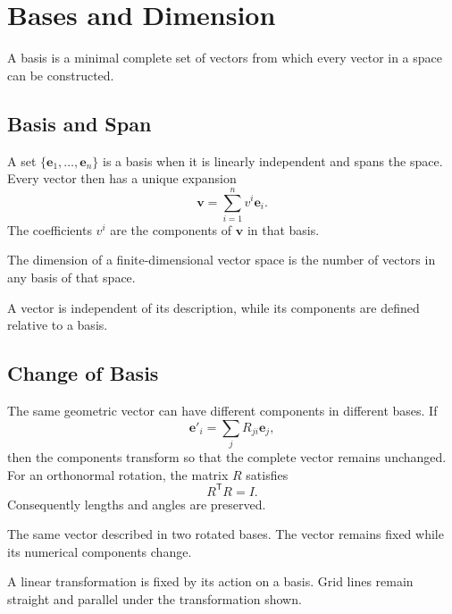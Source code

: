 \section{Bases and Dimension}
\label{sec:bases-dimension}

A basis is a minimal complete set of vectors from which every vector in a space can be constructed.

\subsection{Basis and Span}

A set $\{\mathbf e_1,\ldots,\mathbf e_n\}$ is a basis when it is linearly independent and spans the space. Every vector then has a unique expansion
\[
\mathbf v=\sum_{i=1}^{n}v^i\mathbf e_i.
\]
The coefficients $v^i$ are the components of $\mathbf v$ in that basis.

\begin{definition}
The dimension of a finite-dimensional vector space is the number of vectors in any basis of that space.
\end{definition}

\begin{bookfigure}{A vector is independent of its description, while its components are defined relative to a basis.}

\label{fig:basis-vectors}
\end{bookfigure}

\subsection{Change of Basis}

The same geometric vector can have different components in different bases. If
\[
\mathbf e'_i=\sum_j R_{ji}\mathbf e_j,
\]
then the components transform so that the complete vector remains unchanged. For an orthonormal rotation, the matrix $R$ satisfies
\[
R^{\mathsf T}R=I.
\]
Consequently lengths and angles are preserved.

\begin{bookfigure}{The same vector described in two rotated bases. The vector remains fixed while its numerical components change.}

\end{bookfigure}

\begin{bookfigure}{A linear transformation is fixed by its action on a basis. Grid lines remain straight and parallel under the transformation shown.}

\end{bookfigure}

